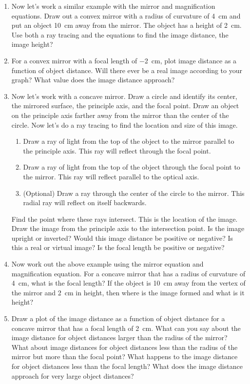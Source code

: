 \begin{enumerate}
\item
Now let's work a similar example with the mirror and magnification equations. Draw out a convex mirror with a radius of curvature of \SI{4}{cm} and put an object \SI{10}{cm} away from the mirror. The object has a height of \SI{2}{cm}. Use both a ray tracing and the equations to find the image distance, the image height?

\item
For a convex mirror with a focal length of \SI{-2}{cm}, plot image distance as a function of object distance. Will there ever be a real image according to your graph? What value does the image distance approach? \bigskip

\item
Now let's work with a concave mirror. Draw a circle and identify its center, the mirrored surface, the principle axis, and the focal point. Draw an object on the principle axis farther away from the mirror than the center of the circle. Now let's do a ray tracing to find the location and size of this image.
\begin{enumerate}
	\item Draw a ray of light from the top of the object to the mirror parallel to the principle axis. This ray will reflect through the focal point.
	\item Draw a ray of light from the top of the object through the focal point to the mirror. This ray will reflect parallel to the optical axis.
	\item (Optional) Draw a ray through the center of the circle to the mirror. This radial ray will reflect on itself backwards. 
\end{enumerate}
Find the point where these rays intersect. This is the location of the image. Draw the image from the principle axis to the intersection point. Is the image upright or inverted? Would this image distance be positive or negative?  Is this a real or virtual image? Is the focal length be positive or negative?\giantskip

\item
Now work out the above example using the mirror equation and magnification equation. For a concave mirror that has a radius of curvature of \SI{4}{cm}, what is the focal length? If the object is \SI{10}{cm} away from the vertex of the mirror and \SI{2}{cm} in height, then where is the image formed and what is it height? \bigskip

\item
 Draw a plot of the image distance as a function of object distance for a concave mirror that has a focal length of \SI{2}{cm}. What can you say about the image distance for object distances larger than the radius of the mirror? What about image distances for object distances less than the radius of the mirror but more than the focal point? What happens to the image distance for object distances less than the focal length? What does the image distance approach for very large object distances?

\newpage 

\ %

\newpage

\end{enumerate}